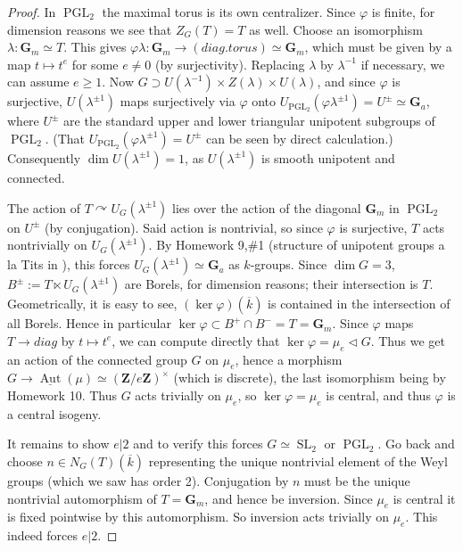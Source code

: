 \documentclass[10pt]{article}
\renewcommand{\phi}{\varphi}
\renewcommand{\(}{\left(}
\renewcommand{\)}{\right)}
\newcommand{\actson}{\curvearrowright}
\numberwithin{thm}{subsection}
\begin{document}
\begin{proof}
In $\operatorname{PGL}_2$ the maximal torus is its own centralizer.
Since $\phi$ is finite, for dimension reasons we see that $Z_G(T)=T$ as well.
Choose an isomorphism $\lambda:\mathbf{G}_m\simeq T$.
This gives $\phi\lambda:\mathbf{G}_m\rightarrow(diag.torus)\simeq \mathbf{G}_m$,
which must be given by a map $t\mapsto t^e$ for some $e\neq 0$ (by surjectivity). Replacing $\lambda$ by $\lambda^{-1}$ if necessary, we can assume $e\geq 1$.
Now $G\supset U(\lambda^{-1})\times Z(\lambda)\times U(\lambda)$,
and since $\phi$ is surjective, $U(\lambda^{\pm1})$ maps surjectively
via $\phi$ onto $U_{\operatorname{PGL}_2}(\phi\lambda^{\pm 1})= U^{\pm}\simeq \mathbf{G}_a$, where $U^\pm$ are the standard upper and lower triangular unipotent subgroups of $\operatorname{PGL}_2$.
(That $U_{\operatorname{PGL}_2}(\phi\lambda^{\pm1})=U^\pm$ can be seen by direct calculation.)
Consequently $\dim U(\lambda^{\pm1})=1$,
as $U(\lambda^{\pm1})$ is smooth unipotent and connected.

The action of $T\actson U_G(\lambda^{\pm1})$ lies
over the action of the diagonal $\mathbf{G}_m$ in $\operatorname{PGL}_2$
on $U^\pm$ (by conjugation).
Said action is nontrivial, so since $\phi$ is surjective,
$T$ acts nontrivially on $U_G(\lambda^{\pm1})$.
By Homework 9,\#1 (structure of unipotent groups a la Tits in
\cite[App.\,B]{pred}), this forces $U_G(\lambda^{\pm1})\simeq \mathbf{G}_a$ as $k$-groups.
Since $\dim G = 3$, $B^\pm:=T\ltimes U_G(\lambda^{\pm1})$ are Borels, for dimension reasons; their intersection is $T$.
Geometrically, it is easy to see, $(\operatorname{ker}\phi)(\overline{k})$ is contained in the intersection of all Borels.
Hence in particular $\operatorname{ker}\phi\subset B^+\cap B^-=T=\mathbf{G}_m$.
Since $\phi$ maps $T\rightarrow diag$ by $t\mapsto t^e$,
we can compute directly
that $\operatorname{ker}\phi=\mu_e\vartriangleleft G$.
Thus we get an action of the connected group $G$
on $\mu_e$, hence a morphism $G\rightarrow\underline{\operatorname{Aut}}(\mu)\simeq (\mathbf{Z}/e\mathbf{Z})^\times$ (which is discrete),
the last isomorphism being by Homework 10.
Thus $G$ acts trivially on $\mu_e$, so $\operatorname{ker}\phi=\mu_e$ is central,
and thus $\phi$ is a central isogeny.

It remains to show $e|2$ and to verify this forces $G\simeq \operatorname{SL}_2$ or $\operatorname{PGL}_2$.
Go back and choose $n\in N_G(T)(\overline{k})$ representing the unique
nontrivial element of the Weyl groups (which we saw has order 2).
Conjugation by $n$ must be the unique nontrivial automorphism of $T=\mathbf{G}_m$,
and hence be inversion.
Since $\mu_e$ is central it is fixed pointwise by this automorphism.
So inversion acts trivially on $\mu_e$. This indeed forces $e|2$.


\end{proof}
\end{document}
